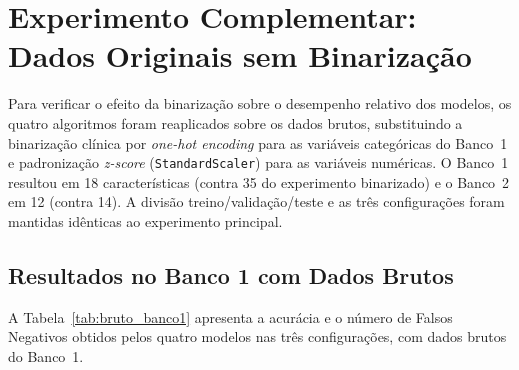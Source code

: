\section{Experimento Complementar: Dados Originais sem Binarização}
\label{sec:resultados_bruto}

Para verificar o efeito da binarização sobre o desempenho relativo dos modelos, os quatro algoritmos foram reaplicados sobre os dados brutos, substituindo a binarização clínica por \textit{one-hot encoding} para as variáveis categóricas do Banco~1 e padronização \textit{z-score} (\texttt{StandardScaler}) para as variáveis numéricas. O Banco~1 resultou em 18 características (contra 35 do experimento binarizado) e o Banco~2 em 12 (contra 14). A divisão treino/validação/teste e as três configurações foram mantidas idênticas ao experimento principal.

\subsection{Resultados no Banco 1 com Dados Brutos}
\label{sec:bruto_banco1}

A Tabela~\ref{tab:bruto_banco1} apresenta a acurácia e o número de Falsos Negativos obtidos pelos quatro modelos nas três configurações, com dados brutos do Banco~1.

\begin{table}[H]
\centering
\caption{Acurácia (\%) e Falsos Negativos (FN), Banco 1, dados brutos. Conjunto de teste: 276 pacientes.}
\label{tab:bruto_banco1}
\end{table}

